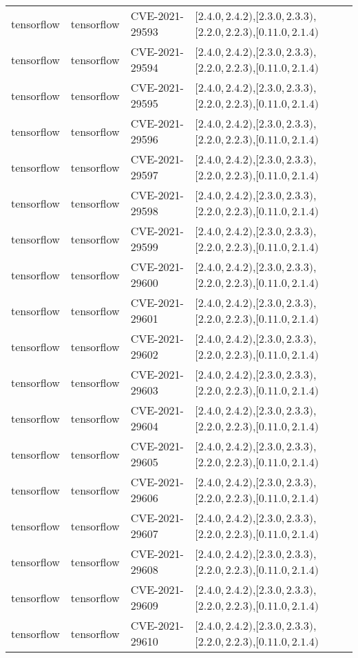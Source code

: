 \begin{tabular}{llll}
tensorflow & tensorflow & CVE-2021-29593 & $[2.4.0,2.4.2)$,$[2.3.0,2.3.3)$,$[2.2.0,2.2.3)$,$[0.11.0,2.1.4)$ \\
tensorflow & tensorflow & CVE-2021-29594 & $[2.4.0,2.4.2)$,$[2.3.0,2.3.3)$,$[2.2.0,2.2.3)$,$[0.11.0,2.1.4)$ \\
tensorflow & tensorflow & CVE-2021-29595 & $[2.4.0,2.4.2)$,$[2.3.0,2.3.3)$,$[2.2.0,2.2.3)$,$[0.11.0,2.1.4)$ \\
tensorflow & tensorflow & CVE-2021-29596 & $[2.4.0,2.4.2)$,$[2.3.0,2.3.3)$,$[2.2.0,2.2.3)$,$[0.11.0,2.1.4)$ \\
tensorflow & tensorflow & CVE-2021-29597 & $[2.4.0,2.4.2)$,$[2.3.0,2.3.3)$,$[2.2.0,2.2.3)$,$[0.11.0,2.1.4)$ \\
tensorflow & tensorflow & CVE-2021-29598 & $[2.4.0,2.4.2)$,$[2.3.0,2.3.3)$,$[2.2.0,2.2.3)$,$[0.11.0,2.1.4)$ \\
tensorflow & tensorflow & CVE-2021-29599 & $[2.4.0,2.4.2)$,$[2.3.0,2.3.3)$,$[2.2.0,2.2.3)$,$[0.11.0,2.1.4)$ \\
tensorflow & tensorflow & CVE-2021-29600 & $[2.4.0,2.4.2)$,$[2.3.0,2.3.3)$,$[2.2.0,2.2.3)$,$[0.11.0,2.1.4)$ \\
tensorflow & tensorflow & CVE-2021-29601 & $[2.4.0,2.4.2)$,$[2.3.0,2.3.3)$,$[2.2.0,2.2.3)$,$[0.11.0,2.1.4)$ \\
tensorflow & tensorflow & CVE-2021-29602 & $[2.4.0,2.4.2)$,$[2.3.0,2.3.3)$,$[2.2.0,2.2.3)$,$[0.11.0,2.1.4)$ \\
tensorflow & tensorflow & CVE-2021-29603 & $[2.4.0,2.4.2)$,$[2.3.0,2.3.3)$,$[2.2.0,2.2.3)$,$[0.11.0,2.1.4)$ \\
tensorflow & tensorflow & CVE-2021-29604 & $[2.4.0,2.4.2)$,$[2.3.0,2.3.3)$,$[2.2.0,2.2.3)$,$[0.11.0,2.1.4)$ \\
tensorflow & tensorflow & CVE-2021-29605 & $[2.4.0,2.4.2)$,$[2.3.0,2.3.3)$,$[2.2.0,2.2.3)$,$[0.11.0,2.1.4)$ \\
tensorflow & tensorflow & CVE-2021-29606 & $[2.4.0,2.4.2)$,$[2.3.0,2.3.3)$,$[2.2.0,2.2.3)$,$[0.11.0,2.1.4)$ \\
tensorflow & tensorflow & CVE-2021-29607 & $[2.4.0,2.4.2)$,$[2.3.0,2.3.3)$,$[2.2.0,2.2.3)$,$[0.11.0,2.1.4)$ \\
tensorflow & tensorflow & CVE-2021-29608 & $[2.4.0,2.4.2)$,$[2.3.0,2.3.3)$,$[2.2.0,2.2.3)$,$[0.11.0,2.1.4)$ \\
tensorflow & tensorflow & CVE-2021-29609 & $[2.4.0,2.4.2)$,$[2.3.0,2.3.3)$,$[2.2.0,2.2.3)$,$[0.11.0,2.1.4)$ \\
tensorflow & tensorflow & CVE-2021-29610 & $[2.4.0,2.4.2)$,$[2.3.0,2.3.3)$,$[2.2.0,2.2.3)$,$[0.11.0,2.1.4)$ \\

\end{tabular}
